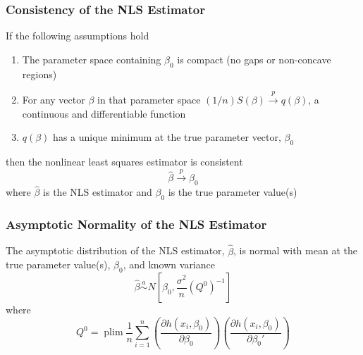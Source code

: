 \documentclass{beamer}
\DeclareMathOperator*{\plim}{plim}
\begin{document}
\begin{frame}\frametitle{Consistency of the NLS Estimator}
    If the following assumptions hold
    \begin{enumerate}
    	\item The parameter space containing $\beta_0$ is compact (no gaps or non-concave regions)
    	\item For any vector $\beta$ in that parameter space $(1 / n) S(\beta) \overset{p}{\rightarrow} q(\beta)$, a continuous and differentiable function
    	\item $q(\beta)$ has a unique minimum at the true parameter vector, $\beta_0$
    \end{enumerate}
    then the nonlinear least squares estimator is consistent
    $$\hat{\beta} \overset{p}{\rightarrow} \beta_0$$
    where $\hat{\beta}$ is the NLS estimator and $\beta_0$ is the true parameter value(s)
\end{frame}

\begin{frame}\frametitle{Asymptotic Normality of the NLS Estimator}
    The asymptotic distribution of the NLS estimator, $\hat{\beta}$, is normal with mean at the true parameter value(s), $\beta_0$, and known variance
    $$\hat{\beta} \overset{a}{\sim} N \left[ \beta_0, \frac{\sigma^2}{n} (Q^0)^{-1} \right]$$
    where
    $$Q^0 = \plim \frac{1}{n} \sum_{i = 1}^n \left( \frac{\partial h(x_i, \beta_0)}{\partial \beta_0} \right) \left( \frac{\partial h(x_i, \beta_0)}{\partial \beta_0'} \right)$$ 
\end{frame}
\end{document}
